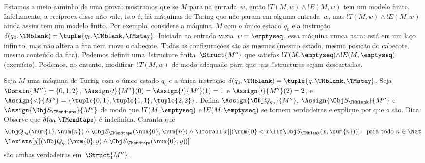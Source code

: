 \documentclass[../../../include/open-logic-section]{subfiles}
\begin{document}
\begin{explain}
  Estamos a meio caminho de uma prova: mostramos que se $M$ para na
  entrada~$w$, então $!T(M,w) \land !E(M,w)$ tem um modelo finito.
  Infelizmente, a recíproca disso não vale, isto é, há máquinas de
  Turing que não param em alguma entrada~$w$, mas $!T(M,w) \land
  !E(M,w)$ ainda assim tem um modelo finito. Por exemplo, considere a
  máquina~$M$ com o único estado $q_0$ e a instrução
  $\delta(q_0,\TMblank) = \tuple{q_0,\TMblank,\TMstay}$. Iniciada na
  entrada vazia~$w = \emptyseq$, essa máquina nunca para: está em um
  laço infinito, mas não altera a fita nem move o cabeçote. Todas as
  configurações são as mesmas (mesmo estado, mesma posição do
  cabeçote, mesmo conteúdo da fita). Podemos definir uma !!{structure}
  finita~$\Struct{M''}$ que satisfaz $!T(M,\emptyseq) \land
  !E(M,\emptyseq)$ (exercício).  Podemos, no entanto,
  modificar~$!T(M,w)$ de modo adequado para que tais !!{structure}s
  sejam descartadas.

  \begin{prob}
    Seja $M$ uma máquina de Turing com o único estado $q_0$ e a única
    instrução $\delta(q_0,\TMblank) = \tuple{q,\TMblank,\TMstay}$.
    Seja $\Domain{M''} = \{0, 1, 2\}$, $\Assign{\prime}{M''}(0) =
    \Assign{\prime}{M'}(1) = 1$ e $\Assign{\prime}{M''}(2) = 2$, e
    $\Assign{<}{M''} = \{\tuple{0,1}, \tuple{1,1}, \tuple{2,2}\}$.
    Defina $\Assign{\Obj Q_{q_0}}{M''}$, $\Assign{\Obj
    S_{\TMblank}}{M''}$ e $\Assign{\Obj S_{\TMendtape}}{M''}$ de modo
    que $!T(M,\emptyseq)$ e $!E(M,\emptyseq)$ se tornem verdadeiras e
    explique por que o são. Dica: Observe que $\delta(q_0, \TMendtape)$
    é indefinida. Garanta que
    \begin{align*}
    & \Obj Q_{q_0}(\num{1}, \num{n}) \land \Obj S_{\TMendtape}(\num{0}, \num{n})
      \land 
      \lforall[x][(\num{0} < x \lif \Obj S_\TMblank(x, \num{n}))] \text{\quad para todo $n \in \Nat$}\\
    & \lexists[y][(\Obj Q_{q_0}(\num{0}, y) \land \Obj S_{\TMendtape}(\num{0}, y))]
    \end{align*}
    são ambas verdadeiras em~$\Struct{M''}$.
  \end{prob}
\end{explain}
\end{document}
